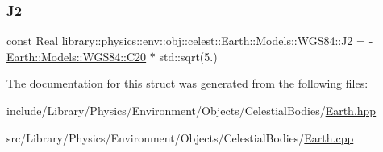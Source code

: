 \subsubsection{\texorpdfstring{J2}{J2}}
{\footnotesize\ttfamily const Real library\+::physics\+::env\+::obj\+::celest\+::\+Earth\+::\+Models\+::\+W\+G\+S84\+::\+J2 = -\/\hyperlink{structlibrary_1_1physics_1_1env_1_1obj_1_1celest_1_1_earth_1_1_models_1_1_w_g_s84_a10f72d2266521d5f5303e9a1ace4c492}{Earth\+::\+Models\+::\+W\+G\+S84\+::\+C20} $\ast$ std\+::sqrt(5.)\hspace{0.3cm}{\ttfamily [static]}}



The documentation for this struct was generated from the following files\+:\begin{DoxyCompactItemize}
\item 
include/\+Library/\+Physics/\+Environment/\+Objects/\+Celestial\+Bodies/\hyperlink{_earth_8hpp}{Earth.\+hpp}\item 
src/\+Library/\+Physics/\+Environment/\+Objects/\+Celestial\+Bodies/\hyperlink{_earth_8cpp}{Earth.\+cpp}\end{DoxyCompactItemize}
